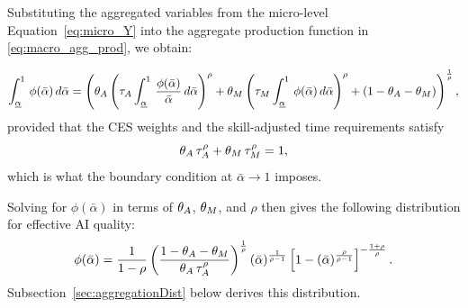 \begin{sloppypar}
Substituting the aggregated variables from the micro-level Equation~\eqref{eq:micro_Y} into the aggregate production function in \eqref{eq:macro_agg_prod}, we obtain:
\end{sloppypar}
\begingroup\smalldisplay
\begin{equation}
\int_{\underline{\alpha}}^{1}\,\phi(\bar{\alpha})\,d\bar{\alpha}
=
\left(
\theta_{A}\left(\tau_{A}\int_{\underline{\alpha}}^{1}\,\frac{\phi(\bar{\alpha})}{\bar{\alpha}}\,d\bar{\alpha}\right)^{\rho}
+
\theta_{M} \left(\tau_{M}\int_{\underline{\alpha}}^{1}\,\phi(\bar{\alpha})\,d\bar{\alpha}\right)^{\rho}
+
\left(1-\theta_{A}-\theta_{M}\right)
\right)^{\frac{1}{\rho}},
\label{eq:macro_agg_prod_with_micro_aggregates}
\end{equation}
\endgroup
provided that the CES weights and the skill-adjusted time requirements satisfy
\begin{equation}
\theta_{A}\,\tau_{A}^{\rho}+\theta_{M}\,\tau_{M}^{\rho}=1,
\label{eq:ces_share_restriction}
\end{equation}
which is what the boundary condition at $\bar{\alpha} \to 1$ imposes.

Solving for $\phi(\bar{\alpha})$ in terms of $\theta_{A}$, $\theta_{M}$, and $\rho$ then gives the following distribution for effective AI quality:
\begin{equation}
\phi(\bar{\alpha})=\frac{1}{1-\rho}\left(\frac{1-\theta_{A}-\theta_{M}}{\theta_{A}\,\tau_{A}^{\rho}}\right)^{\frac{1}{\rho}}(\bar{\alpha})^{\frac{1}{\rho-1}}\left[1-(\bar{\alpha})^{\frac{\rho}{\rho-1}}\right]^{-\frac{1+\rho}{\rho}}.
\label{eq:phi}
\end{equation}
Subsection~\ref{sec:aggregationDist} below derives this distribution.

